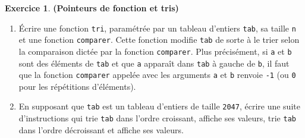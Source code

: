 \documentclass[12pt]{article}
\theoremstyle{definition}
\newtheorem{Exercice}{Exercice}
\begin{document}
\begin{Exercice} {\bf (Pointeurs de fonction et tris)}
\begin{enumerate}
    \item Écrire une fonction {\tt tri}, paramétrée par un tableau
    d'entiers {\tt tab}, sa taille {\tt n} et une fonction {\tt comparer}.
    Cette fonction modifie {\tt tab} de sorte à le trier selon la comparaison
    dictée par la fonction {\tt comparer}. Plus précisément, si {\tt a}
    et {\tt b} sont des éléments de {\tt tab} et que {\tt a} apparaît
    dans {\tt tab} à gauche de {\tt b}, il faut que la fonction
    { \tt comparer} appelée avec les arguments {\tt a} et {\tt b} renvoie
    {\tt -1} (ou {\tt 0} pour les répétitions d'éléments).
    \smallskip

    \item En supposant que {\tt tab} est un tableau d'entiers de taille
    {\tt 2047}, écrire une suite d'instructions qui trie {\tt tab} dans
    l'ordre croissant, affiche ses valeurs, trie {\tt tab} dans
    l'ordre décroissant et affiche ses valeurs.
\end{enumerate}
\end{Exercice}
\bigskip
\end{document}
